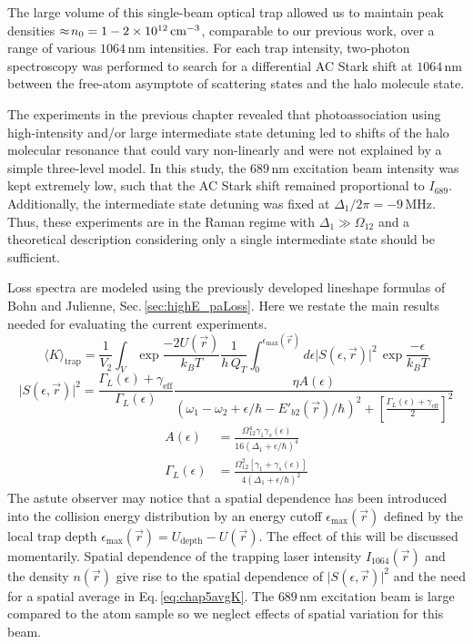 The large volume of this single-beam optical trap allowed us to maintain peak densities $\approx\!n_0 = 1-2 \times 10^{12} \, \text{cm}^{-3}$, comparable to our previous work, over a range of various $1064$\,nm intensities.
For each trap intensity, two-photon spectroscopy was performed to search for a differential AC Stark shift at $1064\,\text{nm}$ between the free-atom asymptote of scattering states and the halo molecule state.

The experiments in the previous chapter revealed that photoassociation using high-intensity and/or large intermediate state detuning led to shifts of the halo molecular resonance that could vary non-linearly and were not explained by a simple three-level model.
In this study, the $689$\,nm excitation beam intensity was kept extremely low, such that the AC Stark shift remained proportional to $I_{689}$.
Additionally, the intermediate state detuning was fixed at $\Delta_1/2 \pi = -9$\,MHz.
Thus, these experiments are in the Raman regime with $\Delta_1 \gg \Omega_{12}$ and a theoretical description considering only a single intermediate state should be sufficient.


Loss spectra are modeled using the previously developed lineshape formulas of Bohn and Julienne, Sec.\,\ref{sec:highE_paLoss}.
Here we restate the main results needed for evaluating the current experiments.
\begingroup
\addtolength{\jot}{1em}
\begin{equation} \label{eq:chap5avgK}
	\langle K \rangle_\text{trap} = \frac{1}{V_2} \int_V \exp{\frac{-2 U(\vec{r})}{k_{B}T}} \frac{1}{h\,Q_{T}} \int_{0}^{\epsilon_{\text{max}}(\vec{r})} d\epsilon \vert S(\epsilon, \vec{r}) \vert^2 \,\exp{\frac{-\epsilon}{k_{B}T}}
\end{equation}
\begin{equation}\label{5equationApproxLorentzian}
  \vert S(\epsilon, \vec{r}) \vert^2 = \frac{\Gamma_L(\epsilon)+\gamma_{\text{eff}}}{\Gamma_L(\epsilon)} \frac{\eta  A(\epsilon)} {\left(\omega_1-\omega_2+\epsilon/\hbar-E'_{b2}(\vec{r})/\hbar\right)^2+\left[
  	\frac{\Gamma_L(\epsilon)+\gamma_{\text{eff}}}{2}\right]^2}
\end{equation}
\begin{align}
  A(\epsilon) &= \frac{\Omega_{12}^{4}\gamma_1 \gamma_s(\epsilon)}{16(\Delta_1+\epsilon/\hbar)^4} \\
  \Gamma_L(\epsilon) &= \frac{\Omega_{12}^{2}[\gamma_1 +\gamma_s(\epsilon)]}{4(\Delta_1+\epsilon/\hbar)^2}
\end{align}
\endgroup
The astute observer may notice that a spatial dependence has been introduced into the collision energy distribution by an energy cutoff $\epsilon_{\text{max}}(\vec{r})$ defined by the local trap depth $\epsilon_{\text{max}}(\vec{r}) = U_{\text{depth}} - U(\vec{r})$.
The effect of this will be discussed momentarily.
Spatial dependence of the trapping laser intensity $I_{1064}(\vec{r})$ and the density $n(\vec{r})$ give rise to the spatial dependence of $\vert S(\epsilon, \vec{r}) \vert^2$ and the need for a spatial average in Eq.\,\ref{eq:chap5avgK}.
The $689$\,nm excitation beam is large compared to the atom sample so we neglect effects of spatial variation for this beam.

